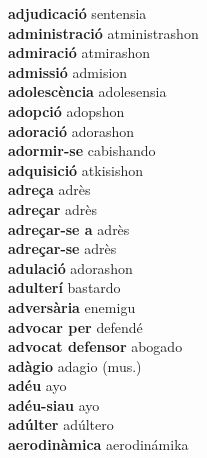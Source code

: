 \textbf{ adjudicació  } sentensia \\
\textbf{ administració  } atministrashon \\
\textbf{ admiració  } atmirashon \\
\textbf{ admissió  } admision \\
\textbf{ adolescència  } adolesensia \\
\textbf{ adopció  } adopshon \\
\textbf{ adoració  } adorashon \\
\textbf{ adormir-se  } cabishando \\
\textbf{ adquisició  } atkisishon \\
\textbf{ adreça  } adrès \\
\textbf{ adreçar  } adrès \\
\textbf{ adreçar-se a  } adrès \\
\textbf{ adreçar-se  } adrès \\
\textbf{ adulació  } adorashon \\
\textbf{ adulterí  } bastardo \\
\textbf{ adversària  } enemigu \\
\textbf{ advocar per  } defendé \\
\textbf{ advocat defensor  } abogado \\
\textbf{ adàgio  } adagio (mus.) \\
\textbf{ adéu  } ayo \\
\textbf{ adéu-siau  } ayo \\
\textbf{ adúlter  } adúltero \\
\textbf{ aerodinàmica  } aerodinámika \\
